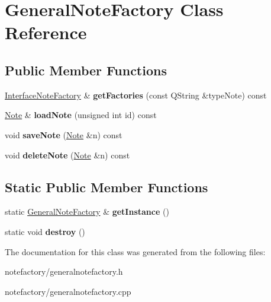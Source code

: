 \hypertarget{class_general_note_factory}{\section{General\-Note\-Factory Class Reference}
\label{class_general_note_factory}
}
\subsection*{Public Member Functions}
\begin{DoxyCompactItemize}
\item 
\hypertarget{class_general_note_factory_ada4ba22c50e4649d07e0a964adca5a1e}{\hyperlink{class_interface_note_factory}{Interface\-Note\-Factory} \& {\bfseries get\-Factories} (const Q\-String \&type\-Note) const }\label{class_general_note_factory_ada4ba22c50e4649d07e0a964adca5a1e}

\item 
\hypertarget{class_general_note_factory_a3bb4d4081ef947b988a68b750629ee25}{\hyperlink{class_note}{Note} \& {\bfseries load\-Note} (unsigned int id) const }\label{class_general_note_factory_a3bb4d4081ef947b988a68b750629ee25}

\item 
\hypertarget{class_general_note_factory_ad2a92f1cd911c41b0b28b1492e3809f3}{void {\bfseries save\-Note} (\hyperlink{class_note}{Note} \&n) const }\label{class_general_note_factory_ad2a92f1cd911c41b0b28b1492e3809f3}

\item 
\hypertarget{class_general_note_factory_abd401ea8b9f71a43715e62cc36370988}{void {\bfseries delete\-Note} (\hyperlink{class_note}{Note} \&n) const }\label{class_general_note_factory_abd401ea8b9f71a43715e62cc36370988}

\end{DoxyCompactItemize}
\subsection*{Static Public Member Functions}
\begin{DoxyCompactItemize}
\item 
\hypertarget{class_general_note_factory_a5d283017f6438ad97947fd3b15b491e3}{static \hyperlink{class_general_note_factory}{General\-Note\-Factory} \& {\bfseries get\-Instance} ()}\label{class_general_note_factory_a5d283017f6438ad97947fd3b15b491e3}

\item 
\hypertarget{class_general_note_factory_ad995b7cef6e27548c3a127d38a3d71d9}{static void {\bfseries destroy} ()}\label{class_general_note_factory_ad995b7cef6e27548c3a127d38a3d71d9}

\end{DoxyCompactItemize}


The documentation for this class was generated from the following files\-:\begin{DoxyCompactItemize}
\item 
notefactory/generalnotefactory.\-h\item 
notefactory/generalnotefactory.\-cpp\end{DoxyCompactItemize}
